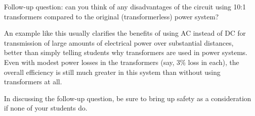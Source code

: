 \vskip 10pt

Follow-up question: can you think of any disadvantages of the circuit using 10:1 transformers compared to the original (transformerless) power system?







An example like this usually clarifies the benefits of using AC instead of DC for transmission of large amounts of electrical power over substantial distances, better than simply telling students why transformers are used in power systems.  Even with modest power losses in the transformers (say, 3\% loss in each), the overall efficiency is still much greater in this system than without using transformers at all.

In discussing the follow-up question, be sure to bring up safety as a consideration if none of your students do.




